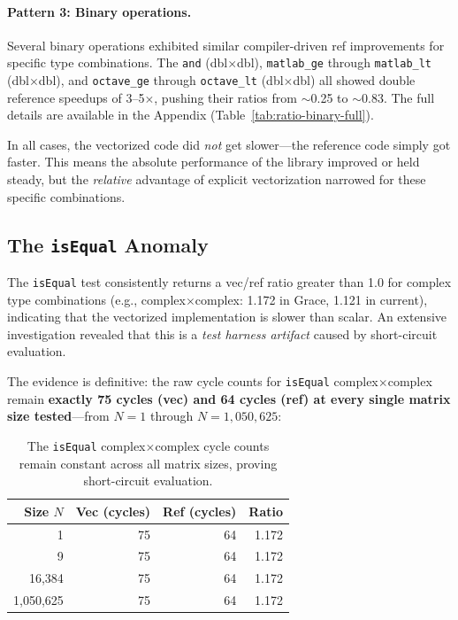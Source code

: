 \paragraph{Pattern 3: Binary operations.} Several binary operations exhibited similar compiler-driven ref improvements for specific type combinations. The \texttt{and} (dbl$\times$dbl), \texttt{matlab\_ge} through \texttt{matlab\_lt} (dbl$\times$dbl), and \texttt{octave\_ge} through \texttt{octave\_lt} (dbl$\times$dbl) all showed double reference speedups of 3--5$\times$, pushing their ratios from $\sim$0.25 to $\sim$0.83. The full details are available in the Appendix (Table~\ref{tab:ratio-binary-full}).

In all cases, the vectorized code did \emph{not} get slower---the reference code simply got faster. This means the absolute performance of the library improved or held steady, but the \emph{relative} advantage of explicit vectorization narrowed for these specific combinations.

\subsection{The \texttt{isEqual} Anomaly}

The \texttt{isEqual} test consistently returns a vec/ref ratio greater than 1.0 for complex type combinations (e.g., complex$\times$complex: 1.172 in Grace, 1.121 in current), indicating that the vectorized implementation is slower than scalar. An extensive investigation revealed that this is a \emph{test harness artifact} caused by short-circuit evaluation.

The evidence is definitive: the raw cycle counts for \texttt{isEqual} complex$\times$complex remain \textbf{exactly 75 cycles (vec) and 64 cycles (ref) at every single matrix size tested}---from $N=1$ through $N=1{,}050{,}625$:

\begin{table}[H]
\centering
\caption{The \texttt{isEqual} complex$\times$complex cycle counts remain constant across all matrix sizes, proving short-circuit evaluation.}
\label{tab:isequal-evidence}
\small
\begin{tabular}{r r r r}
\toprule
Size $N$ & Vec (cycles) & Ref (cycles) & Ratio \\
\midrule
1 & 75 & 64 & 1.172 \\
9 & 75 & 64 & 1.172 \\
16,384 & 75 & 64 & 1.172 \\
1,050,625 & 75 & 64 & 1.172 \\
\bottomrule
\end{tabular}
\end{table}

